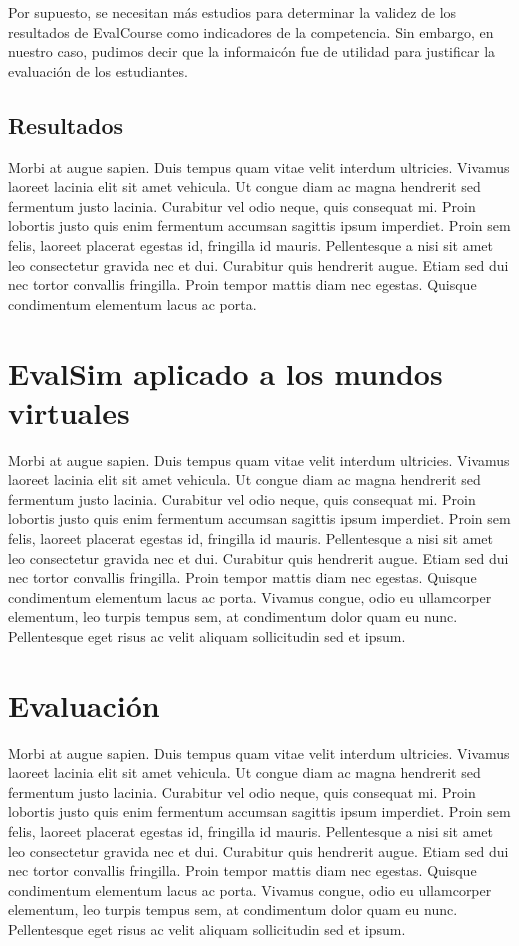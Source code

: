 Por supuesto, se necesitan más estudios para determinar la validez de los resultados de EvalCourse como indicadores de la competencia. Sin embargo, en nuestro caso, pudimos decir que la informaicón fue de utilidad para justificar la evaluación de los estudiantes.

\subsection{Resultados}

Morbi at augue sapien. Duis tempus quam vitae velit interdum ultricies. Vivamus laoreet lacinia elit sit amet vehicula. Ut congue diam ac magna hendrerit sed fermentum justo lacinia. Curabitur vel odio neque, quis consequat mi. Proin lobortis justo quis enim fermentum accumsan sagittis ipsum imperdiet. Proin sem felis, laoreet placerat egestas id, fringilla id mauris. Pellentesque a nisi sit amet leo consectetur gravida nec et dui. Curabitur quis hendrerit augue. Etiam sed dui nec tortor convallis fringilla. Proin tempor mattis diam nec egestas. Quisque condimentum elementum lacus ac porta.

\section{EvalSim aplicado a los mundos virtuales}

Morbi at augue sapien. Duis tempus quam vitae velit interdum ultricies. Vivamus laoreet lacinia elit sit amet vehicula. Ut congue diam ac magna hendrerit sed fermentum justo lacinia. Curabitur vel odio neque, quis consequat mi. Proin lobortis justo quis enim fermentum accumsan sagittis ipsum imperdiet. Proin sem felis, laoreet placerat egestas id, fringilla id mauris. Pellentesque a nisi sit amet leo consectetur gravida nec et dui. Curabitur quis hendrerit augue. Etiam sed dui nec tortor convallis fringilla. Proin tempor mattis diam nec egestas. Quisque condimentum elementum lacus ac porta. Vivamus congue, odio eu ullamcorper elementum, leo turpis tempus sem, at condimentum dolor quam eu nunc. Pellentesque eget risus ac velit aliquam sollicitudin sed et ipsum. 

\section{Evaluación}

Morbi at augue sapien. Duis tempus quam vitae velit interdum ultricies. Vivamus laoreet lacinia elit sit amet vehicula. Ut congue diam ac magna hendrerit sed fermentum justo lacinia. Curabitur vel odio neque, quis consequat mi. Proin lobortis justo quis enim fermentum accumsan sagittis ipsum imperdiet. Proin sem felis, laoreet placerat egestas id, fringilla id mauris. Pellentesque a nisi sit amet leo consectetur gravida nec et dui. Curabitur quis hendrerit augue. Etiam sed dui nec tortor convallis fringilla. Proin tempor mattis diam nec egestas. Quisque condimentum elementum lacus ac porta. Vivamus congue, odio eu ullamcorper elementum, leo turpis tempus sem, at condimentum dolor quam eu nunc. Pellentesque eget risus ac velit aliquam sollicitudin sed et ipsum. 

